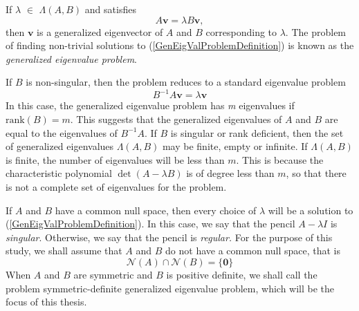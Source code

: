  If $\lambda$ $\in$ $\Lambda(A, B)$ and  satisfies
\begin{equation}\label{GenEigValProblemDefinition}
	A\mathbf{v} = \lambda B\mathbf{v},
\end{equation}
then $\mathbf{v}$ is a generalized eigenvector of $A$ and $B$ corresponding to $\lambda$. The problem of finding non-trivial solutions to (\ref{GenEigValProblemDefinition}) is known as the \textit{generalized eigenvalue problem}.

If $B$ is non-singular, then the problem reduces to a standard eigenvalue problem
\begin{equation}\label{eq:StandardReduction}
	B^{-1}A \mathbf{v} = \lambda \mathbf{v}
\end{equation}
In this case, the generalized eigenvalue problem has \textit{m} eigenvalues if $\text{rank}(B) = m$. This suggests that the generalized eigenvalues of $A$ and $B$ are equal to the eigenvalues of $B^{-1}A$. If $B$ is singular or rank deficient, then the set of generalized eigenvalues $\Lambda(A, B)$ may be finite, empty or infinite. If  $\Lambda(A, B)$ is finite, the number of eigenvalues will be less than $m$. This is because the characteristic polynomial $\det(A- \lambda B)$ is of degree less than $m$, so that there is not a complete set of eigenvalues for the problem.

If $A$ and $B$ have a common null space, then every choice of $\lambda$ will be a solution to (\ref{GenEigValProblemDefinition}). In this case, we say that the pencil $A-\lambda I$ is {\em singular}.  Otherwise, we say that the pencil is {\em regular.}   For the purpose of this study, we shall assume that $A$ and $B$ do not have a common null space, that is
\begin{equation}\label{eq:EmptyCommonNullSpace}
	\mathcal{N}(A) \cap \mathcal{N}(B) = \{\mathbf{0} \}
\end{equation}
When $A$ and $B$ are symmetric and $B$ is positive definite, we shall call the problem symmetric-definite generalized eigenvalue problem, which will be the focus of this thesis.  


